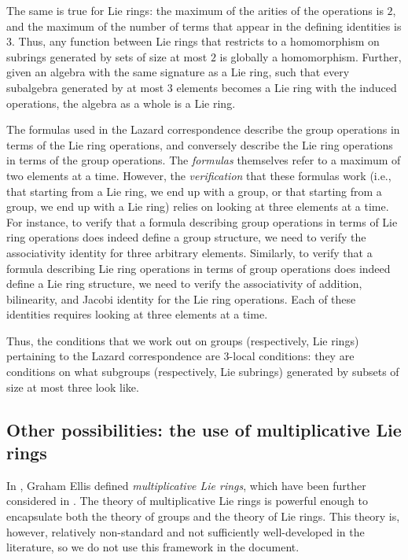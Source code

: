 \documentclass{ucetd}
\begin{document}
The same is true for Lie rings: the maximum of the arities of the
operations is $2$, and the maximum of the number of terms that appear
in the defining identities is $3$. Thus, any function between Lie
rings that restricts to a homomorphism on subrings generated by sets
of size at most $2$ is globally a homomorphism. Further, given an
algebra with the same signature as a Lie ring, such that every
subalgebra generated by at most $3$ elements becomes a Lie ring with
the induced operations, the algebra as a whole is a Lie ring.

The formulas used in the Lazard correspondence describe the group
operations in terms of the Lie ring operations, and conversely
describe the Lie ring operations in terms of the group operations. The
{\em formulas} themselves refer to a maximum of two elements at a
time. However, the {\em verification} that these formulas work (i.e.,
that starting from a Lie ring, we end up with a group, or that
starting from a group, we end up with a Lie ring) relies on looking at
three elements at a time. For instance, to verify that a formula
describing group operations in terms of Lie ring operations does
indeed define a group structure, we need to verify the associativity
identity for three arbitrary elements. Similarly, to verify that a
formula describing Lie ring operations in terms of group operations
does indeed define a Lie ring structure, we need to verify the
associativity of addition, bilinearity, and Jacobi identity for the
Lie ring operations. Each of these identities requires looking at
three elements at a time.

Thus, the conditions that we work out on groups (respectively, Lie
rings) pertaining to the Lazard correspondence are $3$-local
conditions: they are conditions on what subgroups (respectively, Lie
subrings) generated by subsets of size at most three look like.

\subsection{Other possibilities: the use of multiplicative Lie rings}

In \cite{Ellis93}, Graham Ellis defined {\em multiplicative Lie
  rings}, which have been further considered in
\cite{homologyofmultiplicativeLierings}. The theory of multiplicative
Lie rings is powerful enough to encapsulate both the theory of groups
and the theory of Lie rings. This theory is, however, relatively
non-standard and not sufficiently well-developed in the literature, so
we do not use this framework in the document. 
\end{document}
